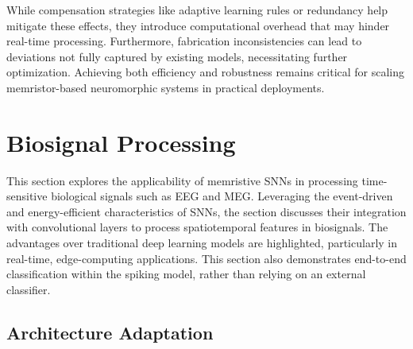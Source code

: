 \noindent While compensation strategies like adaptive learning rules or redundancy help mitigate these effects, they introduce computational overhead that may hinder real-time processing. Furthermore, fabrication inconsistencies can lead to deviations not fully captured by existing models, necessitating further optimization. Achieving both efficiency and robustness remains critical for scaling memristor-based neuromorphic systems in practical deployments.

\section[Biosignal Processing]{Biosignal Processing}


This section explores the applicability of memristive SNNs in processing time-sensitive biological signals such as EEG and MEG. Leveraging the event-driven and energy-efficient characteristics of SNNs, the section discusses their integration with convolutional layers to process spatiotemporal features in biosignals. The advantages over traditional deep learning models are highlighted, particularly in real-time, edge-computing applications. This section also demonstrates end-to-end classification within the spiking model, rather than relying on an external classifier.

\subsection{Architecture Adaptation}



